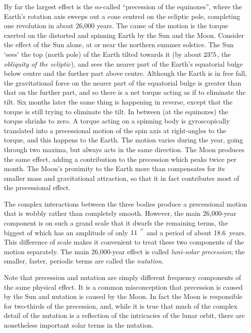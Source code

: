 \documentclass[11pt,fleqn,twoside]{article}
\renewcommand{\_}{{\tt\char'137}}     %
\newcommand{\degree}[2] {$#1^{\circ}
                        \hspace{-0.37em}.\hspace{0.02em}#2$}
\newcommand{\arcseci}[1] {$#1\hspace{0.05em}$\raisebox{-0.5ex}
                         {$^{'\hspace{-0.1em}'\hspace{0.0em}}$}}
\begin{document}
By far the largest effect is the
so-called ``precession of the equinoxes'', where the Earth's
rotation axis sweeps out a cone centred on the ecliptic
pole, completing one revolution in about 26,000 years.  The
cause of the motion is the torque exerted on the distorted and
spinning Earth by the Sun and the Moon.  Consider the effect of the
Sun alone, at or near the northern summer solstice.  The Sun
`sees' the top (north pole) of the Earth tilted towards it
(by about \degree{23}{5}, the {\it obliquity of the
ecliptic}\/),
and sees the nearer part of the Earth's equatorial bulge
below centre and the further part above centre.
Although the Earth is in free fall,
the gravitational force on the nearer part of the
equatorial bulge is greater than that on the further part, and
so there is a net torque acting
as if to eliminate the tilt.  Six months later the same thing
is happening in reverse, except that the torque is still
trying to eliminate the tilt.  In between (at the equinoxes) the
torque shrinks to zero.  A torque acting on a spinning body
is gyroscopically translated
into a precessional motion of the spin axis at right-angles to the torque,
and this happens to the Earth.
The motion varies during the
year, going through two maxima, but always acts in the
same direction.  The Moon produces the same effect,
adding a contribution to the precession which peaks twice
per month.  The Moon's proximity to the Earth more than compensates
for its smaller mass and gravitational attraction, so that it
in fact contributes most of the precessional effect.
 
The complex interactions between the three bodies produce a
precessional motion that is wobbly rather than completely smooth.
However, the main 26,000-year component is on such a grand scale that
it dwarfs the remaining terms, the biggest of
which has an amplitude of only \arcseci{11} and a period of
about 18.6~years.  This difference of scale makes it convenient to treat
these two components of the motion separately.  The main 26,000-year
effect is called {\it luni-solar precession};  the smaller,
faster, periodic terms are called the {\it nutation}.
 
Note that precession and nutation are simply
different frequency components of the same physical effect.  It is
a common misconception that precession is caused
by the Sun and nutation is caused by the Moon.  In fact
the Moon is responsible for two-thirds of the precession, and,
while it is true that much of the complex detail of the nutation is
a reflection of the intricacies of the lunar orbit, there are
nonetheless important solar terms in the nutation.
 
\end{document}
